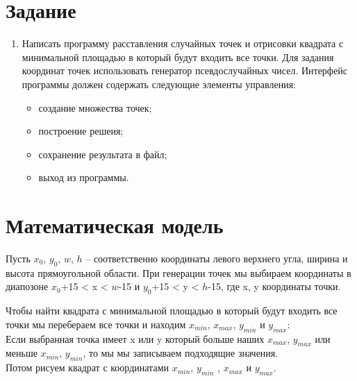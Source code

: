 \documentclass[14pt, a4paper]{extreport}
\begin{document}
\author{Малахов~В.А.}
\maketitle

\chapter{Задание}

\begin{enumerate}

	\item
	Написать программу расставления случайных точек и отрисовки квадрата с минимальной площадью в который будут входить все точки. Для задания координат точек использовать генератор псевдослучайных чисел. Интерфейс программы должен содержать следующие элементы управления:
	\begin{itemize}
		\item создание множества точек;
		\item построение решеия;
		\item сохранение результата в файл;
		\item выход из программы.
	\end{itemize}

\end{enumerate}

\chapter{Математическая модель}

Пусть $x_0$, $y_0$, $w$, $h$ -- соответственно координаты левого верхнего угла, ширина и высота прямоугольной области.
При генерации точек мы выбираем координаты в диапозоне $x_0$+15 < x < $w$-15 и $y_0$+15 < y < $h$-15, где x, y координаты точки.
\par Чтобы найти квадрата с минимальной площадью в который будут входить все точки мы перебераем все точки и находим $x_{min}$, $x_{max}$, $y_{min}$ и $y_{max}$:\\
Если выбранная точка имеет x или y который больше наших $x_{max}$, $y_{max}$ или меньше $x_{min}$, $y_{min}$, то мы мы записываем подходящие значения.\\
Потом рисуем квадрат с координатами $x_{min}$, $y_{min}$ , $x_{max}$ и $y_{max}$.
\end{document}
